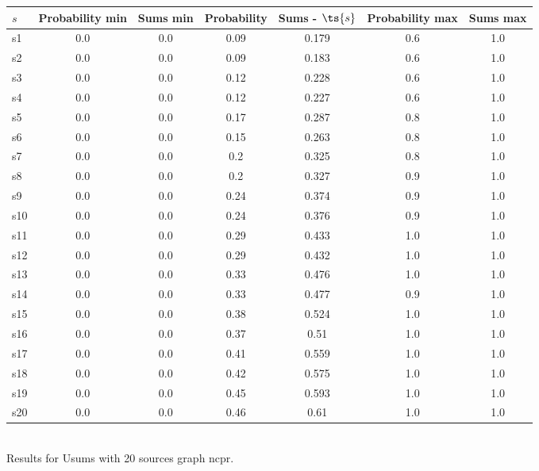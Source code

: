 \documentclass{article}
\begin{document}
\noindent\begin{tabular}{|l|c|c|c|c|c|c|}
\hline
$s$& Probability min & Sums min & Probability & Sums - $\ts{s}$ & Probability max & Sums max\\
\hline
s1 &0.0 & 0.0 & 0.09 & 0.179 & 0.6 & 1.0\\
\hline
s2 &0.0 & 0.0 & 0.09 & 0.183 & 0.6 & 1.0\\
\hline
s3 &0.0 & 0.0 & 0.12 & 0.228 & 0.6 & 1.0\\
\hline
s4 &0.0 & 0.0 & 0.12 & 0.227 & 0.6 & 1.0\\
\hline
s5 &0.0 & 0.0 & 0.17 & 0.287 & 0.8 & 1.0\\
\hline
s6 &0.0 & 0.0 & 0.15 & 0.263 & 0.8 & 1.0\\
\hline
s7 &0.0 & 0.0 & 0.2 & 0.325 & 0.8 & 1.0\\
\hline
s8 &0.0 & 0.0 & 0.2 & 0.327 & 0.9 & 1.0\\
\hline
s9 &0.0 & 0.0 & 0.24 & 0.374 & 0.9 & 1.0\\
\hline
s10 &0.0 & 0.0 & 0.24 & 0.376 & 0.9 & 1.0\\
\hline
s11 &0.0 & 0.0 & 0.29 & 0.433 & 1.0 & 1.0\\
\hline
s12 &0.0 & 0.0 & 0.29 & 0.432 & 1.0 & 1.0\\
\hline
s13 &0.0 & 0.0 & 0.33 & 0.476 & 1.0 & 1.0\\
\hline
s14 &0.0 & 0.0 & 0.33 & 0.477 & 0.9 & 1.0\\
\hline
s15 &0.0 & 0.0 & 0.38 & 0.524 & 1.0 & 1.0\\
\hline
s16 &0.0 & 0.0 & 0.37 & 0.51 & 1.0 & 1.0\\
\hline
s17 &0.0 & 0.0 & 0.41 & 0.559 & 1.0 & 1.0\\
\hline
s18 &0.0 & 0.0 & 0.42 & 0.575 & 1.0 & 1.0\\
\hline
s19 &0.0 & 0.0 & 0.45 & 0.593 & 1.0 & 1.0\\
\hline
s20 &0.0 & 0.0 & 0.46 & 0.61 & 1.0 & 1.0\\
\hline
\end{tabular}\\

\noindent Results for Usums with 20 sources graph ncpr.
\end{document}
